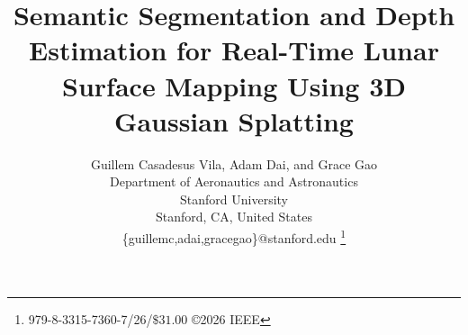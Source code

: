\documentclass[twocolumn,letterpaper]{IEEEAerospaceCLS}
\begin{document}

\title{Semantic Segmentation and Depth Estimation for Real-Time Lunar Surface Mapping Using 3D Gaussian Splatting}

\author{%
	Guillem Casadesus Vila, Adam Dai, and Grace Gao\\
	Department of Aeronautics and Astronautics\\
	Stanford University\\
	Stanford, CA, United States\\
	\{guillemc,adai,gracegao\}@stanford.edu
	\thanks{\footnotesize 979-8-3315-7360-7/26/$\$31.00$ \copyright2026 IEEE}
}

\maketitle

\thispagestyle{plain}
\pagestyle{plain}


\tableofcontents







\small





\end{document}
